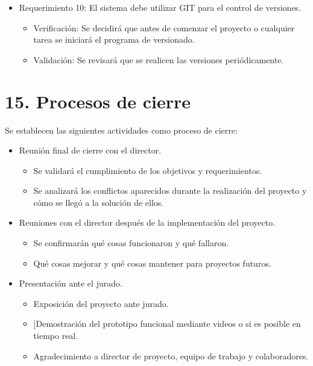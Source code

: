 \documentclass[
11pt, %
]{charter}
\begin{document}
\begin{itemize} 
\item Requerimiento 10: El sistema debe utilizar GIT para el control de versiones.

\begin{itemize}
	\item Verificación: Se decidirá que antes de comenzar el proyecto o cualquier tarea se iniciará el programa de versionado.
	\item Validación: Se revisará que se realicen las versiones periódicamente.
\end{itemize}

\end{itemize}

\section{15. Procesos de cierre}    
\label{sec:cierre}

Se establecen las siguientes actividades como proceso de cierre:

\begin{itemize}
	\item Reunión final de cierre con el director.
	\begin{itemize}
		\item Se validará el cumplimiento de los objetivos y requerimientos.
		\item Se analizará los conflictos aparecidos durante la realización del proyecto y cómo se llegó a la solución de ellos.
	\end{itemize}
\end{itemize}

\newpage
\begin{itemize}
	\item Reuniones con el director después de la implementación del proyecto.
	\begin{itemize}
		\item Se confirmarán qué cosas funcionaron y qué fallaron.
		\item Qué cosas mejorar y qué cosas mantener para proyectos futuros.
	\end{itemize}
\end{itemize}

\begin{itemize}
	\item Presentación ante el jurado.
	\begin{itemize}
		\item Exposición del proyecto ante jurado.
		\item ]Demostración del prototipo funcional mediante videos o si es posible en tiempo real.
		\item Agradecimiento a director de proyecto, equipo de trabajo y colaboradores.
	\end{itemize}
\end{itemize}
\end{document}
